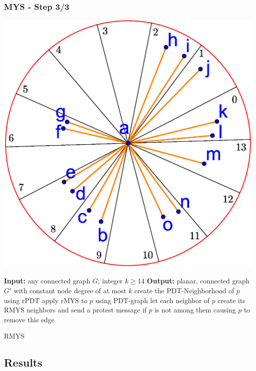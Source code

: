 \documentclass[compress]{beamer}
\begin{document}
\begin{frame} 
\frametitle{MYS - Step 3/3}
	\center \includegraphics[width=0.65\linewidth]{RMYS_3.eps}
\end{frame}

\begin{frame}
\begin{algorithm}[H]
\begin{algorithmic}[0]
\STATE \textbf{Input:} any connected graph $G $; integer $k\geq 14 $
\STATE \textbf{Output:} planar, connected graph $G' $ with constant node degree of at most $k $
\STATE create the PDT-Neighborhood of $p $ using rPDT
\STATE apply rMYS to $p $ using PDT-graph
\STATE let each neighbor of $p $ create its RMYS neighbors and send a protest message if $p $ is not among them causing $p $ to remove this edge
\ENDFOR
\end{algorithmic}
\caption{RMYS}
\end{algorithm}
\end{frame}


\subsection{Results}
\end{document}

